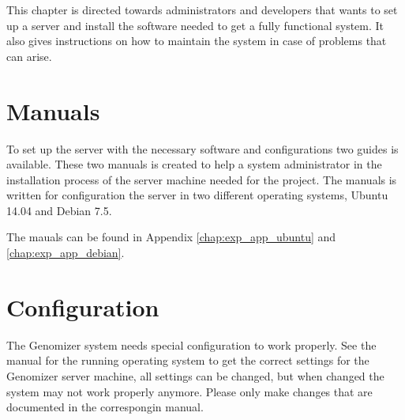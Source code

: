 This chapter is directed towards administrators and developers that wants to
set up a server and install the software needed to get a fully functional system.
It also gives instructions on how to maintain the system in case of problems
that can arise.
\section{Manuals}
To set up the server with the necessary software and configurations two guides is available. These two manuals is created to help a system administrator in the installation process of the server machine needed for the project. The manuals is written for configuration the server in two different operating systems, Ubuntu 14.04 and Debian 7.5. 

The mauals can be found in Appendix \ref{chap:exp_app_ubuntu} and \ref{chap:exp_app_debian}.

\section{Configuration}
The Genomizer system needs special configuration to work properly. See the manual for the running operating system to get the correct settings for the Genomizer server machine, all settings can be changed, but when changed the system may not work properly anymore. Please only make changes that are documented in the correspongin manual.